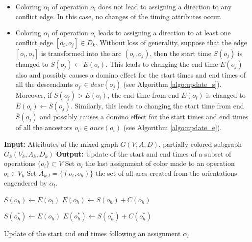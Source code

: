 \begin{itemize}
\item Coloring $\alpha_l$ of operation $o_i$ does not lead to assigning a direction to any conflict edge. In this case, no changes of the timing attributes occur.
\item Coloring $\alpha_l$ of operation $o_i$ leads to assigning a direction to at least one conflict edge $[o_i,o_j] \in D_k$. Without loss of generality, suppose that the edge $[o_i,o_j]$ is transformed into the arc $(o_i,o_j)$, then the start time $S(o_j)$ is changed to $S(o_j) \leftarrow E(o_i)$. This leads to changing the end time $E(o_j)$ also and possibly causes a domino effect for the start times and end times of all the descendants $o_{j'} \in desc(o_j)$ (see Algorithm \ref{algo:update_s}). Moreover, if $\overline{S}(o_j) > \overline{E}(o_i)$, the end time from end $\overline{E}(o_i)$ is changed to $\overline{E}(o_i) \leftarrow \overline{S}(o_j)$. Similarly, this leads to changing the start time from end $\overline{S}(o_j)$ and possibly causes a domino effect for the start times and end times of all the ancestors $o_{i'} \in ance(o_i)$ (see Algorithm \ref{algo:update_e}).
\end{itemize}

\begin{algorithm}[htb]
	\textbf{Input:} Attributes of the mixed graph $G(V,A,D)$, partially colored subgraph $G_k(V_k,A_k,D_k)$\;
	\textbf{Output:} Update of the start and end times of a subset of operations $\{o_i\} \subset V$\;
	Set $\alpha_l$ the last assignment of color made to an operation $o_i \in V_k$\;
	Set $A_{k,l} = \{(o_t,o_h)\}$ the set of all arcs created from the orientations engendered by $\alpha_l$.
		{
				{
					$S(o_h) \leftarrow E(o_t)$\;
					$E(o_h) \leftarrow S(o_h) + C(o_h)$\;
					
				}
		}
		{
			{
						{
							{
								$S(o_h^*) \leftarrow E(o_h)$\;
								$E(o_h^*) \leftarrow S(o_h^*) + C(o_h^*)$\;
								\;
							}
						}
			}
			 \KwRet\;
		}
	\caption{Update of the start and end times following an assignment $\alpha_l$}
	\label{algo:update_s}
\end{algorithm}


